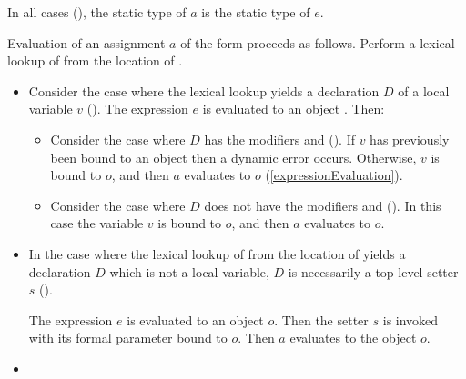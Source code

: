 \documentclass[makeidx]{article}
\begin{document}
\LMHash{}%
In all cases
(),
the static type of $a$ is the static type of $e$.

\LMHash{}%
%
Evaluation of an assignment $a$ of the form 
proceeds as follows.
Perform a lexical lookup of \code{\id=} from the location of \id.

\begin{itemize}
\item
  Consider the case where the lexical lookup yields
  a declaration $D$ of a local variable $v$
  ().
  The expression $e$ is evaluated to an object .
  Then:

  \begin{itemize}
  \item
    Consider the case where $D$ has the modifiers \LATE{} and \FINAL{}
    ().
    If $v$ has previously been bound to an object then a dynamic error occurs.
    Otherwise, $v$ is bound to $o$, and then $a$ evaluates to $o$
    (\ref{expressionEvaluation}).
  \item
    Consider the case where $D$ does not have the modifiers \LATE{} and \FINAL{}
    ().
    In this case the variable $v$ is bound to $o$,
    and then $a$ evaluates to $o$.

  \end{itemize}
\item
  In the case where the lexical lookup of \code{\id=}
  from the location of \id{}
  yields a declaration $D$ which is not a local variable,
  $D$ is necessarily a top level setter $s$
  ().


  The expression $e$ is evaluated to an object $o$.
  Then the setter $s$ is invoked
  with its formal parameter bound to $o$.
  Then $a$ evaluates to the object $o$.
\item
\end{itemize}
\EndCase
\end{document}
